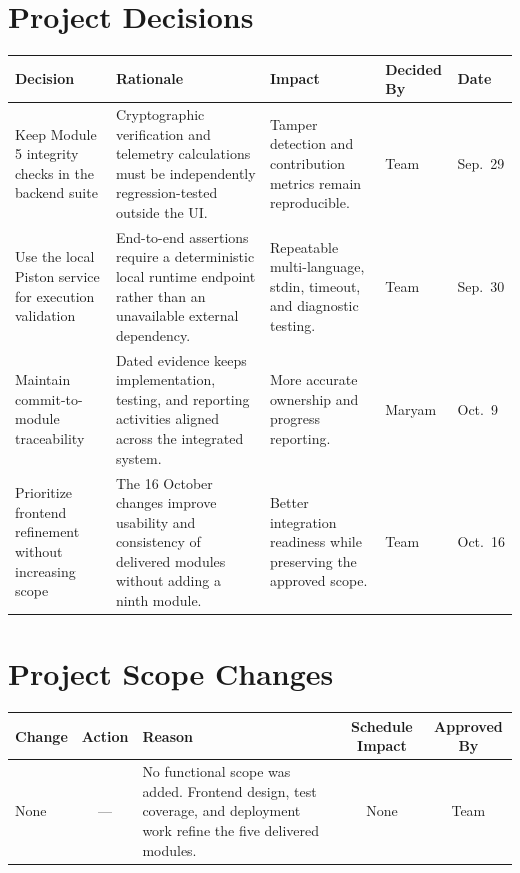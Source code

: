 \documentclass[11pt,a4paper]{article}
\renewcommand{\arraystretch}{1.15}
\begin{document}
\section{Project Decisions}

\begin{table}[htbp]
\centering
\label{tab:project-decisions}
\renewcommand{\arraystretch}{1.3}
\small
\begin{tabular}{>{\raggedright\arraybackslash}p{2.9cm}
                >{\raggedright\arraybackslash}p{4.0cm}
                >{\raggedright\arraybackslash}p{3.4cm}
                >{\centering\arraybackslash}p{1.8cm}
                >{\centering\arraybackslash}p{1.3cm}}
\toprule
\textbf{Decision} & \textbf{Rationale} & \textbf{Impact} & \textbf{Decided By} & \textbf{Date} \\
\midrule
Keep Module 5 integrity checks in the backend suite & Cryptographic verification and telemetry calculations must be independently regression-tested outside the UI. & Tamper detection and contribution metrics remain reproducible. & Team & Sep.\ 29 \\
Use the local Piston service for execution validation & End-to-end assertions require a deterministic local runtime endpoint rather than an unavailable external dependency. & Repeatable multi-language, stdin, timeout, and diagnostic testing. & Team & Sep.\ 30 \\
Maintain commit-to-module traceability & Dated evidence keeps implementation, testing, and reporting activities aligned across the integrated system. & More accurate ownership and progress reporting. & Maryam & Oct.\ 9 \\
Prioritize frontend refinement without increasing scope & The 16 October changes improve usability and consistency of delivered modules without adding a ninth module. & Better integration readiness while preserving the approved scope. & Team & Oct.\ 16 \\
\bottomrule
\end{tabular}
\normalsize
\end{table}
\renewcommand{\arraystretch}{1.15}

\section{Project Scope Changes}

\small
\begin{tabular}{p{2.8cm} c p{3.3cm} c c}
\toprule
\textbf{Change} & \textbf{Action} & \textbf{Reason} & \textbf{Schedule Impact} & \textbf{Approved By} \\
\midrule
None & --- & No functional scope was added. Frontend design, test coverage, and deployment work refine the five delivered modules. & None & Team \\
\bottomrule
\end{tabular}
\normalsize
\end{document}
